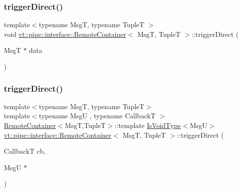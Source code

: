 \mbox{\label{structvt_1_1pipe_1_1interface_1_1_remote_container_ac699178c54ddc68c0e670b747629b396}} 
\subsubsection{\texorpdfstring{trigger\+Direct()}{triggerDirect()}\hspace{0.1cm}{\footnotesize\ttfamily [3/5]}}
{\footnotesize\ttfamily template$<$typename MsgT, typename TupleT $>$ \\
void \hyperlink{structvt_1_1pipe_1_1interface_1_1_remote_container}{vt\+::pipe\+::interface\+::\+Remote\+Container}$<$ MsgT, TupleT $>$\+::trigger\+Direct (\begin{DoxyParamCaption}\item[{MsgT $\ast$}]{data }\end{DoxyParamCaption})\hspace{0.3cm}{\ttfamily [private]}}

\mbox{\label{structvt_1_1pipe_1_1interface_1_1_remote_container_ac109c549822ea32fe268e09d37e21822}} 
\subsubsection{\texorpdfstring{trigger\+Direct()}{triggerDirect()}\hspace{0.1cm}{\footnotesize\ttfamily [4/5]}}
{\footnotesize\ttfamily template$<$typename MsgT, typename TupleT$>$ \\
template$<$typename MsgU , typename CallbackT $>$ \\
\hyperlink{structvt_1_1pipe_1_1interface_1_1_remote_container}{Remote\+Container}$<$MsgT,TupleT$>$\+::template \hyperlink{structvt_1_1pipe_1_1interface_1_1_remote_container_a0cf5387a6b1db885a7a224bab60ce16d}{Is\+Void\+Type}$<$MsgU$>$ \hyperlink{structvt_1_1pipe_1_1interface_1_1_remote_container}{vt\+::pipe\+::interface\+::\+Remote\+Container}$<$ MsgT, TupleT $>$\+::trigger\+Direct (\begin{DoxyParamCaption}\item[{CallbackT}]{cb,  }\item[{MsgU $\ast$}]{ }\end{DoxyParamCaption})}


